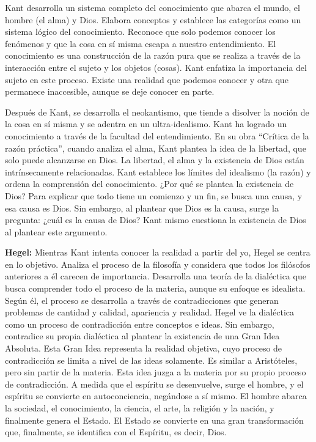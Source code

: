 \documentclass[
  jou,
  floatsintext,
  longtable,
  a4paper,
  nolmodern,
  notxfonts,
  notimes,
  12pt,
  colorlinks=true,linkcolor=blue,citecolor=blue,urlcolor=blue]{apa7}
\begin{document}
Kant desarrolla un sistema completo del conocimiento que abarca el
mundo, el hombre (el alma) y Dios. Elabora conceptos y establece las
categorías como un sistema lógico del conocimiento. Reconoce que solo
podemos conocer los fenómenos y que la cosa en sí misma escapa a nuestro
entendimiento. El conocimiento es una construcción de la razón pura que
se realiza a través de la interacción entre el sujeto y los objetos
(cosas). Kant enfatiza la importancia del sujeto en este proceso. Existe
una realidad que podemos conocer y otra que permanece inaccesible,
aunque se deje conocer en parte.

Después de Kant, se desarrolla el neokantismo, que tiende a disolver la
noción de la cosa en sí misma y se adentra en un ultra-idealismo. Kant
ha logrado un conocimiento a través de la facultad del entendimiento. En
su obra ``Crítica de la razón práctica'', cuando analiza el alma, Kant
plantea la idea de la libertad, que solo puede alcanzarse en Dios. La
libertad, el alma y la existencia de Dios están intrínsecamente
relacionadas. Kant establece los límites del idealismo (la razón) y
ordena la comprensión del conocimiento. ¿Por qué se plantea la
existencia de Dios? Para explicar que todo tiene un comienzo y un fin,
se busca una causa, y esa causa es Dios. Sin embargo, al plantear que
Dios es la causa, surge la pregunta: ¿cuál es la causa de Dios? Kant
mismo cuestiona la existencia de Dios al plantear este argumento.

\textbf{Hegel:} Mientras Kant intenta conocer la realidad a partir del
yo, Hegel se centra en lo objetivo. Analiza el proceso de la filosofía y
considera que todos los filósofos anteriores a él carecen de
importancia. Desarrolla una teoría de la dialéctica que busca comprender
todo el proceso de la materia, aunque su enfoque es idealista. Según él,
el proceso se desarrolla a través de contradicciones que generan
problemas de cantidad y calidad, apariencia y realidad. Hegel ve la
dialéctica como un proceso de contradicción entre conceptos e ideas. Sin
embargo, contradice su propia dialéctica al plantear la existencia de
una Gran Idea Absoluta. Esta Gran Idea representa la realidad objetiva,
cuyo proceso de contradicción se limita a nivel de las ideas solamente.
Es similar a Aristóteles, pero sin partir de la materia. Esta idea juzga
a la materia por su propio proceso de contradicción. A medida que el
espíritu se desenvuelve, surge el hombre, y el espíritu se convierte en
autoconciencia, negándose a sí mismo. El hombre abarca la sociedad, el
conocimiento, la ciencia, el arte, la religión y la nación, y finalmente
genera el Estado. El Estado se convierte en una gran transformación que,
finalmente, se identifica con el Espíritu, es decir, Dios.
\end{document}
